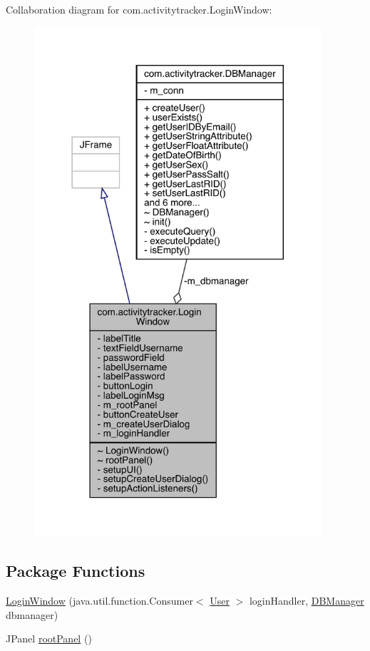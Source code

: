 Collaboration diagram for com.\+activitytracker.\+Login\+Window\+:
\nopagebreak
\begin{figure}[H]
\begin{center}
\leavevmode
\includegraphics[width=302pt]{classcom_1_1activitytracker_1_1_login_window__coll__graph}
\end{center}
\end{figure}
\subsection*{Package Functions}
\begin{DoxyCompactItemize}
\item 
\mbox{\hyperlink{classcom_1_1activitytracker_1_1_login_window_a78c4da2fb8767f2645d1e3681e77cae7}{Login\+Window}} (java.\+util.\+function.\+Consumer$<$ \mbox{\hyperlink{classcom_1_1activitytracker_1_1_user}{User}} $>$ login\+Handler, \mbox{\hyperlink{classcom_1_1activitytracker_1_1_d_b_manager}{D\+B\+Manager}} dbmanager)
\item 
J\+Panel \mbox{\hyperlink{classcom_1_1activitytracker_1_1_login_window_ab1ea45e86bbb79bccd06531279f1e443}{root\+Panel}} ()
\end{DoxyCompactItemize}
